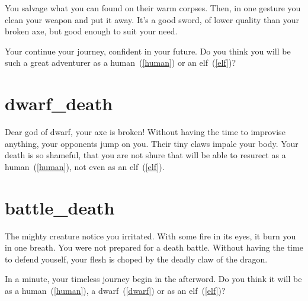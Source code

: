 You salvage what you can found on their warm corpses. Then, in one gesture you
clean your weapon and put it away. It's a good sword, of lower quality than your
broken axe, but good enough to suit your need.

Your continue your journey, confident in your future. Do you think you will be
such a great adventurer as a human~(\ref{human}) or an elf~(\ref{elf})?

\section{dwarf_death}

Dear god of dwarf, your axe is broken! Without having the time to improvise
anything, your opponents jump on you. Their tiny claws impale your body. Your
death is so shameful, that you are not shure that will be able to resurect as a
human~(\ref{human}), not even as an elf~(\ref{elf}).

\section{battle_death}

The mighty creature notice you irritated. With some fire in its eyes, it burn
you in one breath. You were not prepared for a death battle. Without having the
time to defend youself, your flesh is choped by the deadly claw of the dragon.

\medbreak

In a minute, your timeless journey begin in the afterword. Do you think it will
be as a human~(\ref{human}), a dwarf~(\ref{dwarf}) or as an elf~(\ref{elf})?
